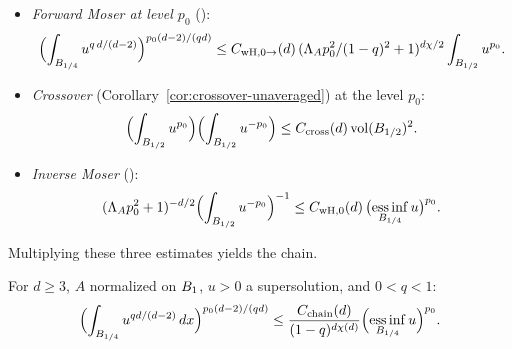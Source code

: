 \begin{itemize}
\item \emph{Forward Moser at level $p_0$}
  ():
\begin{equation*}
\Bigl(\int_{B_{1/4}} u^{q\,d/(d-2)}\Bigr)^{p_0(d-2)/(qd)}
\leq C_{\mathrm{wH},0\to}(d)\,(\Lambda_A p_0^2/(1-q)^2 + 1)^{d\chi/2}
\int_{B_{1/2}} u^{p_0}.
\end{equation*}

\item \emph{Crossover} (Corollary~\ref{cor:crossover-unaveraged}) at the level
$p_0$:
\begin{equation*}
\Bigl(\int_{B_{1/2}} u^{p_0}\Bigr)\Bigl(\int_{B_{1/2}} u^{-p_0}\Bigr)
\leq C_{\mathrm{cross}}(d)\,\mathrm{vol}(B_{1/2})^2.
\end{equation*}

\item \emph{Inverse Moser}
  ():
\begin{equation*}
(\Lambda_A p_0^2 + 1)^{-d/2}\Bigl(\int_{B_{1/2}} u^{-p_0}\Bigr)^{-1}
\leq C_{\mathrm{wH},0}(d)\,\bigl(\operatorname*{ess\,inf}_{B_{1/4}} u\bigr)^{p_0}.
\end{equation*}
\end{itemize}

Multiplying these three estimates yields the chain.

\begin{theorem}
\label{thm:wH-chain}
\leanok
{}
For $d \geq 3$, $A$ normalized on $B_{1}$, $u > 0$ a supersolution, and
$0 < q < 1$:
\begin{equation*}
\Bigl(\int_{B_{1/4}} u^{q d/(d-2)}\,dx\Bigr)^{p_0(d-2)/(qd)}
\leq \frac{C_{\mathrm{chain}}(d)}{(1-q)^{d\chi(d)}}
\Bigl(\operatorname*{ess\,inf}_{B_{1/4}} u\Bigr)^{p_0}.
\end{equation*}
\end{theorem}

